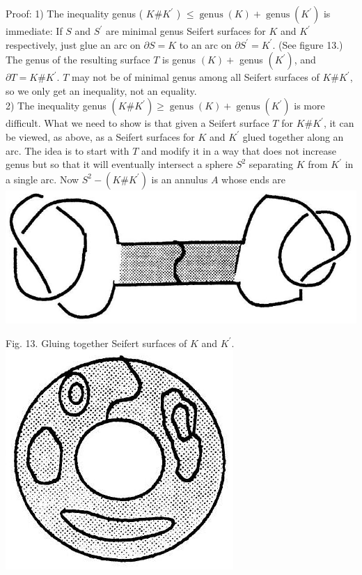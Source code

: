 \documentclass[10pt, letterpaper]{article}
\begin{document}
Proof: 1) The inequality genus ( $K \# K^{\prime}$ ) $\leq \operatorname{genus}(K)+\operatorname{genus}\left(K^{\prime}\right)$ is immediate: If $S$ and $S^{\prime}$ are minimal genus Seifert surfaces for $K$ and $K^{\prime}$ respectively, just glue an arc on $\partial S=K$ to an arc on $\partial S^{\prime}=K^{\prime}$. (See figure 13.) The genus of the resulting surface $T$ is genus $(K)+$ genus $\left(K^{\prime}\right)$, and $\partial T=K \# K^{\prime}$. $T$ may not be of minimal genus among all Seifert surfaces of $K \# K^{\prime}$, so we only get an inequality, not an equality.\\
2) The inequality genus $\left(K \# K^{\prime}\right) \geq \operatorname{genus}(K)+\operatorname{genus}\left(K^{\prime}\right)$ is more difficult. What we need to show is that given a Seifert surface $T$ for $K \# K^{\prime}$, it can be viewed, as above, as a Seifert surfaces for $K$ and $K^{\prime}$ glued together along an arc. The idea is to start with $T$ and modify it in a way that does not increase genus but so that it will eventually intersect a sphere $S^{2}$ separating $K$ from $K^{\prime}$ in a single arc. Now $S^{2}-\left(K \# K^{\prime}\right)$ is an annulus $A$ whose ends are\\
\includegraphics[scale=0.2, center]{2025_05_21_037de704f595ce642d3eg-085(1)}

Fig. 13. Gluing together Seifert surfaces of $K$ and $K^{\prime}$.\\
\includegraphics[scale=0.2, center]{2025_05_21_037de704f595ce642d3eg-085}
\end{document}
